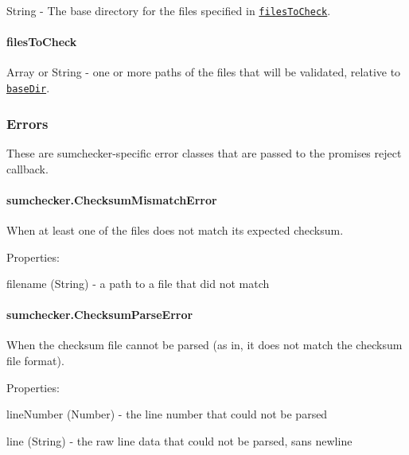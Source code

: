 {\ttfamily String} -\/ The base directory for the files specified in \href{#filesToCheck}{\tt {\ttfamily files\+To\+Check}}.

\paragraph*{{\ttfamily files\+To\+Check}}

{\ttfamily Array} or {\ttfamily String} -\/ one or more paths of the files that will be validated, relative to \href{#baseDir}{\tt {\ttfamily base\+Dir}}.

\subsubsection*{Errors}

These are {\ttfamily sumchecker}-\/specific error classes that are passed to the promise\textquotesingle{}s reject callback.

\paragraph*{{\ttfamily sumchecker.\+Checksum\+Mismatch\+Error}}

When at least one of the files does not match its expected checksum.

Properties\+:


\begin{DoxyItemize}
\item {\ttfamily filename} ({\ttfamily String}) -\/ a path to a file that did not match
\end{DoxyItemize}

\paragraph*{{\ttfamily sumchecker.\+Checksum\+Parse\+Error}}

When the checksum file cannot be parsed (as in, it does not match the checksum file format).

Properties\+:


\begin{DoxyItemize}
\item {\ttfamily line\+Number} ({\ttfamily Number}) -\/ the line number that could not be parsed
\item {\ttfamily line} ({\ttfamily String}) -\/ the raw line data that could not be parsed, sans newline
\end{DoxyItemize}

